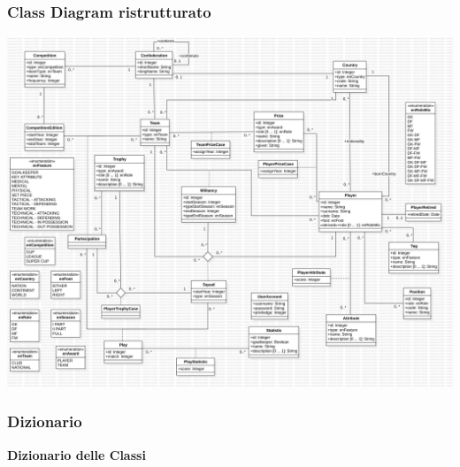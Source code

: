 \newpage
\subsubsection{\Large Class Diagram ristrutturato}
\includegraphics[width=\textwidth]{res/class_diagram_ristr}
\newpage

\subsubsection{\Large Dizionario}

\begin{center}
	\textbf{Dizionario delle Classi}
\end{center}


